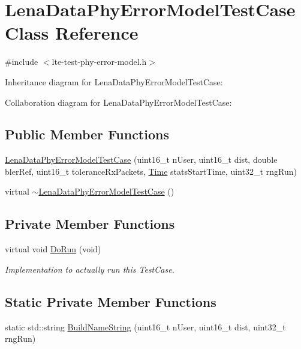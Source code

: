 \hypertarget{classLenaDataPhyErrorModelTestCase}{}\section{Lena\+Data\+Phy\+Error\+Model\+Test\+Case Class Reference}
\label{classLenaDataPhyErrorModelTestCase}


{\ttfamily \#include $<$lte-\/test-\/phy-\/error-\/model.\+h$>$}



Inheritance diagram for Lena\+Data\+Phy\+Error\+Model\+Test\+Case\+:


Collaboration diagram for Lena\+Data\+Phy\+Error\+Model\+Test\+Case\+:
\subsection*{Public Member Functions}
\begin{DoxyCompactItemize}
\item 
\hyperlink{classLenaDataPhyErrorModelTestCase_a1ab39f50c546e5131a7b2f8496ccdc49}{Lena\+Data\+Phy\+Error\+Model\+Test\+Case} (uint16\+\_\+t n\+User, uint16\+\_\+t dist, double bler\+Ref, uint16\+\_\+t tolerance\+Rx\+Packets, \hyperlink{classns3_1_1Time}{Time} stats\+Start\+Time, uint32\+\_\+t rng\+Run)
\item 
virtual \hyperlink{classLenaDataPhyErrorModelTestCase_ae5e08c13d9ca0b1f9f273c58ef9efcc7}{$\sim$\+Lena\+Data\+Phy\+Error\+Model\+Test\+Case} ()
\end{DoxyCompactItemize}
\subsection*{Private Member Functions}
\begin{DoxyCompactItemize}
\item 
virtual void \hyperlink{classLenaDataPhyErrorModelTestCase_a363738c5b8d73b6b3398dc526faf7792}{Do\+Run} (void)
\begin{DoxyCompactList}\small\item\em Implementation to actually run this Test\+Case. \end{DoxyCompactList}\end{DoxyCompactItemize}
\subsection*{Static Private Member Functions}
\begin{DoxyCompactItemize}
\item 
static std\+::string \hyperlink{classLenaDataPhyErrorModelTestCase_a31d5f8d7e34775fd382a1c2cde0292ed}{Build\+Name\+String} (uint16\+\_\+t n\+User, uint16\+\_\+t dist, uint32\+\_\+t rng\+Run)
\end{DoxyCompactItemize}
